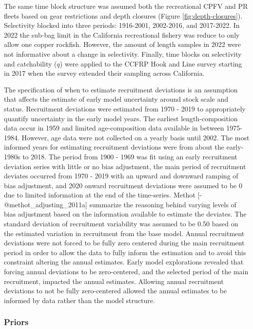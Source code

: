 \documentclass[11pt,
  letterpaper,
]{article}
\begin{document}
The same time block structure was assumed both the recreational CPFV and PR fleets based on gear restrictions and depth closures (Figure \ref{fig:depth-closures}). Selectivity blocked into three periods: 1916-2001, 2002-2016, and 2017-2022. In 2022 the sub-bag limit in the California recreational fishery was reduce to only allow one copper rockfish. However, the amount of length samples in 2022 were not informative about a change in selectivity. Finally, time blocks on selectivity and catchability (\(q\)) were applied to the CCFRP Hook and Line survey starting in 2017 when the survey extended their sampling across California.

The specification of when to estimate recruitment deviations is an assumption that affects the estimate of early model uncertainty around stock scale and status. Recruitment deviations were estimated from 1970 - 2019 to appropriately quantify uncertainty in the early model years. The earliest length-composition data occur in 1959 and limited age-composition data available in between 1975-1984. However, age data were not collected on a yearly basis until 2002. The most informed years for estimating recruitment deviations were from about the early-1980s to 2018. The period from 1900 - 1969 was fit using an early recruitment deviation series with little or no bias adjustment, the main period of recruitment deviates occurred from 1970 - 2019 with an upward and downward ramping of bias adjustment, and 2020 onward recruitment deviations were assumed to be 0 due to limited information at the end of the time-series. Methot {[}-@methot\_adjusting\_2011a{]} summarize the reasoning behind varying levels of bias adjustment based on the information available to estimate the deviates. The standard deviation of recruitment variability was assumed to be 0.50 based on the estimated variation in recruitment from the base model. Annual recruitment deviations were not forced to be fully zero centered during the main recruitment period in order to allow the data to fully inform the estimation and to avoid this constraint altering the annual estimates. Early model explorations revealed that forcing annual deviations to be zero-centered, and the selected period of the main recruitment, impacted the annual estimates. Allowing annual recruitment deviations to not be fully zero-centered allowed the annual estimates to be informed by data rather than the model structure.

\subsubsection{Priors}\label{priors}
\end{document}
